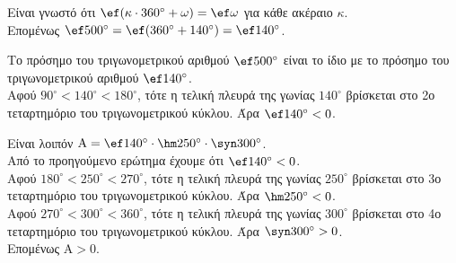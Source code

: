 \begin{alist}
\item Είναι γνωστό ότι $\ef (\kappa \cdot 360^\circ + \omega) = \ef \omega$ για κάθε ακέραιο $\kappa$. \\
Επομένως $\ef  500^\circ = \ef (360^\circ + 140^\circ) = \ef  140^\circ$.
\item 
\begin{rlist}
\item Το πρόσημο του τριγωνομετρικού αριθμού $\ef  500^\circ$ είναι το ίδιο με το πρόσημο του τριγωνομετρικού αριθμού $\ef  140^\circ$. \\
Αφού $90^\circ < 140^\circ < 180^\circ$, τότε η τελική πλευρά της γωνίας $140^\circ$ βρίσκεται στο 2ο τεταρτημόριο του τριγωνομετρικού κύκλου. Άρα $\ef  140^\circ < 0$.
\item Είναι λοιπόν $\text{A} = \ef  140^\circ \cdot \hm  250^\circ \cdot \syn  300^\circ$. \\
Από το προηγούμενο ερώτημα έχουμε ότι $\ef  140^\circ < 0$. \\
Αφού $180^\circ < 250^\circ < 270^\circ$, τότε η τελική πλευρά της γωνίας $250^\circ$ βρίσκεται στο 3ο τεταρτημόριο του τριγωνομετρικού κύκλου. Άρα $\hm  250^\circ < 0$. \\
Αφού $270^\circ < 300^\circ < 360^\circ$, τότε η τελική πλευρά της γωνίας $300^\circ$ βρίσκεται στο 4ο τεταρτημόριο του τριγωνομετρικού κύκλου. Άρα $\syn  300^\circ > 0$. \\
Επομένως $\text{A} > 0$.
\end{rlist}
\end{alist}

